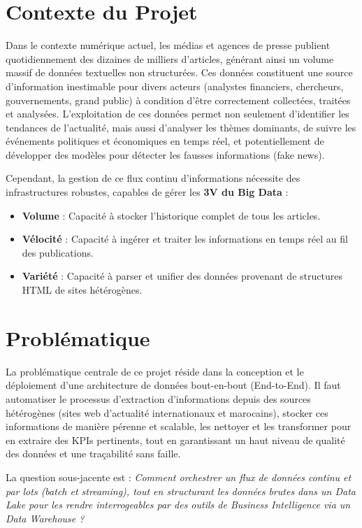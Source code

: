 \documentclass[12pt,a4paper]{report}
\begin{document}
\section{Contexte du Projet}
Dans le contexte numérique actuel, les médias et agences de presse publient quotidiennement des dizaines de milliers d'articles, générant ainsi un volume massif de données textuelles non structurées. Ces données constituent une source d'information inestimable pour divers acteurs (analystes financiers, chercheurs, gouvernements, grand public) à condition d'être correctement collectées, traitées et analysées. L'exploitation de ces données permet non seulement d'identifier les tendances de l'actualité, mais aussi d'analyser les thèmes dominants, de suivre les événements politiques et économiques en temps réel, et potentiellement de développer des modèles pour détecter les fausses informations (fake news).

Cependant, la gestion de ce flux continu d'informations nécessite des infrastructures robustes, capables de gérer les \textbf{3V du Big Data} :
\begin{itemize}
    \item \textbf{Volume} : Capacité à stocker l'historique complet de tous les articles.
    \item \textbf{Vélocité} : Capacité à ingérer et traiter les informations en temps réel au fil des publications.
    \item \textbf{Variété} : Capacité à parser et unifier des données provenant de structures HTML de sites hétérogènes.
\end{itemize}

\section{Problématique}
La problématique centrale de ce projet réside dans la conception et le déploiement d'une architecture de données bout-en-bout (End-to-End). Il faut automatiser le processus d'extraction d'informations depuis des sources hétérogènes (sites web d'actualité internationaux et marocains), stocker ces informations de manière pérenne et scalable, les nettoyer et les transformer pour en extraire des KPIs pertinents, tout en garantissant un haut niveau de qualité des données et une traçabilité sans faille.

La question sous-jacente est : \textit{Comment orchestrer un flux de données continu et par lots (batch et streaming), tout en structurant les données brutes dans un Data Lake pour les rendre interrogeables par des outils de Business Intelligence via un Data Warehouse ?}
\end{document}
